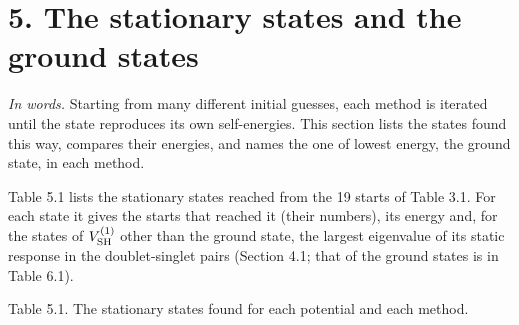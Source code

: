 \documentclass[
  10pt,
]{article}
\begin{document}
\hypertarget{the-stationary-states-and-the-ground-states}{%
\section{5. The stationary states and the ground
states}\label{the-stationary-states-and-the-ground-states}}

\emph{In words.} Starting from many different initial guesses, each
method is iterated until the state reproduces its own self-energies.
This section lists the states found this way, compares their energies,
and names the one of lowest energy, the ground state, in each method.

Table 5.1 lists the stationary states reached from the 19 starts of
Table 3.1. For each state it gives the starts that reached it (their
numbers), its energy and, for the states of \(V^{(1)}_{\rm SH}\) other
than the ground state, the largest eigenvalue of its static response in
the doublet-singlet pairs (Section 4.1; that of the ground states is in
Table 6.1).

Table 5.1. The stationary states found for each potential and each
method.
\end{document}
